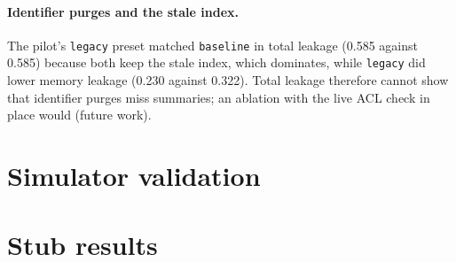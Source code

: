 \paragraph{Identifier purges and the stale index.}
The pilot's \texttt{legacy} preset matched \texttt{baseline} in total leakage (0.585 against 0.585)
because both keep the stale index, which dominates, while \texttt{legacy} did lower memory leakage
(0.230 against 0.322). Total leakage therefore cannot show that identifier purges miss summaries; an
ablation with the live ACL check in place would (future work).

\section{Simulator validation}
\label{app:validation}

\section{Stub results}
\label{app:stub}
